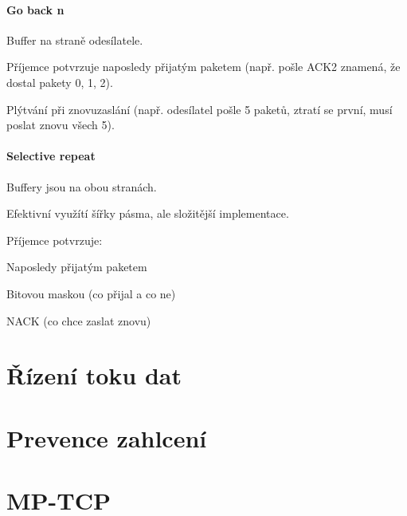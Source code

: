 \paragraph*{Go back n} \begin{compactitem}
    \item Buffer na straně odesílatele.
    \item Příjemce potvrzuje naposledy přijatým paketem (např. pošle ACK2 znamená, že dostal pakety 0, 1, 2).
    \item Plýtvání při znovuzaslání (např. odesílatel pošle 5 paketů, ztratí se první, musí poslat znovu všech 5).
\end{compactitem}

\paragraph*{Selective repeat} \begin{compactitem}
    \item Buffery jsou na obou stranách.
    \item Efektivní využítí šířky pásma, ale složitější implementace.
    \item Příjemce potvrzuje: \begin{compactitem}
        \item Naposledy přijatým paketem
        \item Bitovou maskou (co přijal a co ne)
        \item NACK (co chce zaslat znovu)
    \end{compactitem}
\end{compactitem}


\section{Řízení toku dat}


\section{Prevence zahlcení}



\section{MP-TCP}

